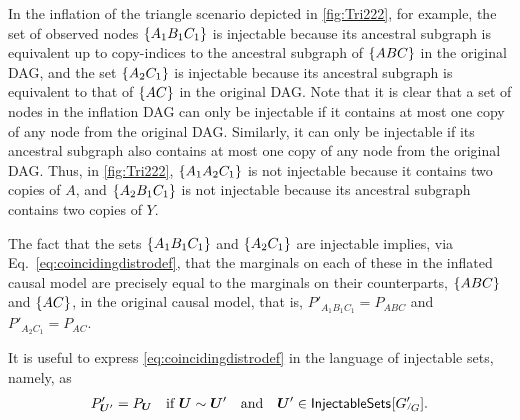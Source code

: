 In the inflation of the triangle scenario depicted in \cref{fig:Tri222}, for example, the set of observed nodes $\left\lbrace A_1 B_1 C_1\right\rbrace$ is injectable because its ancestral subgraph is equivalent up to copy-indices to the ancestral subgraph of $\left\lbrace A B C\right\rbrace$ in the original DAG, and the set $\left\lbrace A_2 C_1\right\rbrace$ is injectable because its ancestral subgraph is equivalent to that of $\left\lbrace A C\right\rbrace$ in the original DAG.  Note that it is clear that a set of nodes in the inflation DAG can only be injectable if it contains at most one copy of any node from the original DAG.  Similarly, it can only be injectable if its ancestral subgraph also contains at most one copy of any node from the original DAG.  
Thus, in \cref{fig:Tri222}, $\left\lbrace A_1 A_2 C_1\right\rbrace$ is not injectable because it contains two copies of $A$, and $\left\lbrace A_2 B_1 C_1\right\rbrace$ is not injectable because its ancestral subgraph contains two copies of $Y$. 

The fact that the sets $\left\lbrace A_1 B_1 C_1\right\rbrace$ and $\left\lbrace A_2 C_1\right\rbrace$ are injectable implies, via Eq.~\eqref{eq:coincidingdistrodef}, that the marginals on each of these in the inflated causal model are precisely equal to the marginals on their counterparts, $\left\lbrace A B C\right\rbrace$ and $\left\lbrace A C\right\rbrace$, in the original causal model, that is, $P'_{A_1 B_1 C_1} = P_{A B C}$ and $P'_{A_2 C_1} = P_{A C}$.

It is useful to express \cref{eq:coincidingdistrodef} in the language of injectable sets, namely, as 
\begin{align}\label{keyinference}
P'_{\bm{U}'}=P_{\bm{U}}\quad\text{if }  \bm{U} \sim \bm{U}'\quad \text{and} \quad \bm{U}'\in\SmallNamedFunction{InjectableSets}{{G'}_{\!\!^{/\!}G}}.%
\end{align}

